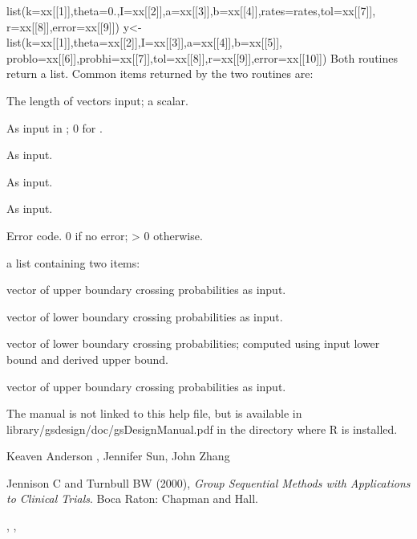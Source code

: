 \begin{Value}
list(k=xx[[1]],theta=0.,I=xx[[2]],a=xx[[3]],b=xx[[4]],rates=rates,tol=xx[[7]],
r=xx[[8]],error=xx[[9]])
y<-list(k=xx[[1]],theta=xx[[2]],I=xx[[3]],a=xx[[4]],b=xx[[5]],
problo=xx[[6]],probhi=xx[[7]],tol=xx[[8]],r=xx[[9]],error=xx[[10]])
Both routines return a list. Common items returned by the two routines are: 
\begin{ldescription}
\item[\code{k}] The length of vectors input; a scalar.
\item[\code{theta}] As input in ; 0 for .
\item[\code{I}] As input.
\item[\code{a}] 
\item[\code{b}] 
\item[\code{tol}] As input.
\item[\code{r}] As input.
\item[\code{error}] Error code. 0 if no error; > 0 otherwise.
\item[\code{rates}] a list containing two items:
\item[\code{falsepos}] vector of upper boundary crossing probabilities as input.
\item[\code{trueneg}] vector of lower boundary crossing probabilities as input.
\item[\code{problo}] vector of lower boundary crossing probabilities; computed using input lower bound
and derived upper bound.
\item[\code{probhi}] vector of upper boundary crossing probabilities as input.
\end{ldescription}
\end{Value}
\begin{Note}\relax
The manual is not linked to this help file, but is available in library/gsdesign/doc/gsDesignManual.pdf
in the directory where R is installed.
\end{Note}
\begin{Author}\relax
Keaven Anderson , Jennifer Sun, John Zhang
\end{Author}
\begin{References}\relax
Jennison C and Turnbull BW (2000), \emph{Group Sequential Methods with Applications to Clinical Trials}.
Boca Raton: Chapman and Hall.
\end{References}
\begin{SeeAlso}\relax
{}, , 
\end{SeeAlso}
